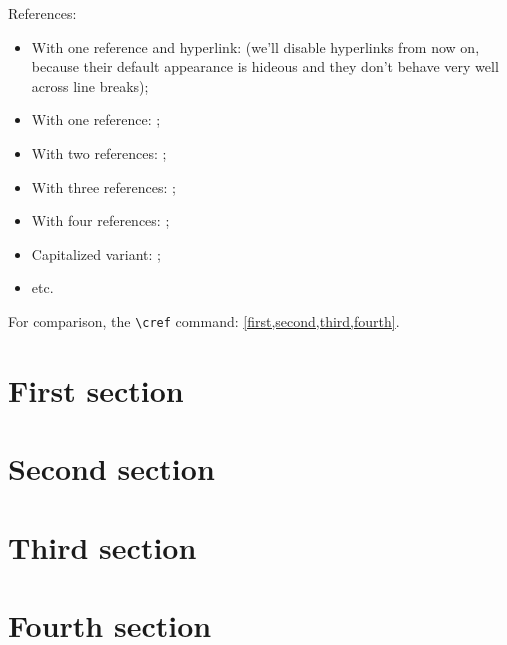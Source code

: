 \documentclass[english]{article}
\begin{document}
References:
\begin{itemize}
\item With one reference and hyperlink:  (we'll disable
  hyperlinks from now on, because their default appearance is hideous and they
  don't behave very well across line breaks);
\item With one reference: ;
\item With two references: ;
\item With three references: ;
\item With four references: ;
\item Capitalized variant: ;
\item etc.
\end{itemize}

For comparison, the \verb|\cref| command: \cref{first,second,third,fourth}.

\section{First section}
\label{first}

\section{Second section}
\label{second}

\section{Third section}
\label{third}

\section{Fourth section}
\label{fourth}
\end{document}
